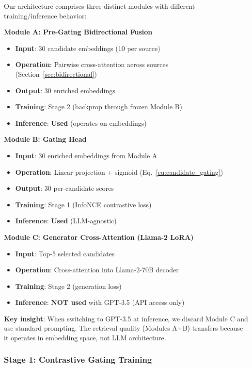 \documentclass[10pt,twocolumn]{article}
\begin{document}
Our architecture comprises three distinct modules with different training/inference behavior:

\textbf{Module A: Pre-Gating Bidirectional Fusion}
\begin{itemize}
    \item \textbf{Input}: 30 candidate embeddings (10 per source)
    \item \textbf{Operation}: Pairwise cross-attention across sources (Section~\ref{sec:bidirectional})
    \item \textbf{Output}: 30 enriched embeddings
    \item \textbf{Training}: Stage 2 (backprop through frozen Module B)
    \item \textbf{Inference}: \textbf{Used} (operates on embeddings)
\end{itemize}

\textbf{Module B: Gating Head}
\begin{itemize}
    \item \textbf{Input}: 30 enriched embeddings from Module A
    \item \textbf{Operation}: Linear projection + sigmoid (Eq.~\ref{eq:candidate_gating})
    \item \textbf{Output}: 30 per-candidate scores
    \item \textbf{Training}: Stage 1 (InfoNCE contrastive loss)
    \item \textbf{Inference}: \textbf{Used} (LLM-agnostic)
\end{itemize}

\textbf{Module C: Generator Cross-Attention (Llama-2 LoRA)}
\begin{itemize}
    \item \textbf{Input}: Top-5 selected candidates
    \item \textbf{Operation}: Cross-attention into Llama-2-70B decoder
    \item \textbf{Training}: Stage 2 (generation loss)
    \item \textbf{Inference}: \textbf{NOT used} with GPT-3.5 (API access only)
\end{itemize}

\textbf{Key insight}: When switching to GPT-3.5 at inference, we discard Module C and use standard prompting. The retrieval quality (Modules A+B) transfers because it operates in embedding space, not LLM architecture.


\subsubsection{Stage 1: Contrastive Gating Training}
\label{sec:stage1}
\end{document}
